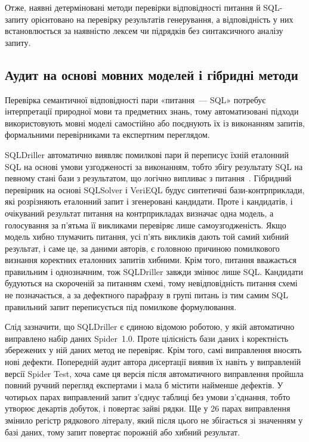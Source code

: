 \documentclass[a4paper,14pt,oneside]{extreport}
\begin{document}
Отже, наявні детерміновані методи перевірки відповідності питання й SQL-запиту орієнтовано на перевірку результатів генерування, а відповідність у них встановлюється за наявністю лексем чи підрядків без синтаксичного аналізу запиту.

\subsection{Аудит на основі мовних моделей і гібридні методи}
\label{subsec:llm-audit}

Перевірка семантичної відповідності пари «питання~--- SQL» потребує інтерпретації природної мови та предметних знань, тому автоматизовані підходи використовують мовні моделі самостійно або поєднують їх із виконанням запитів, формальними перевірниками та експертним переглядом.

SQLDriller автоматично виявляє помилкові пари й переписує їхній еталонний SQL на основі умови узгодженості за виконанням, тобто збігу результату SQL на певному стані бази з результатом, що логічно випливає з питання~\cite{yang2025sqldriller}. Гібридний перевірник на основі SQLSolver і VeriEQL будує синтетичні бази-контрприклади, які розрізняють еталонний запит і згенеровані кандидати. Проте і кандидатів, і очікуваний результат питання на контрприкладах визначає одна модель, а голосування за п'ятьма її викликами перевіряє лише самоузгодженість. Якщо модель хибно тлумачить питання, усі п'ять викликів дають той самий хибний результат, і саме це, за даними авторів, є головною причиною помилкового визнання коректних еталонних запитів хибними. Крім того, питання вважається правильним і однозначним, тож SQLDriller завжди змінює лише SQL. Кандидати будуються на скороченій за питанням схемі, тому невідповідність питання схемі не позначається, а за дефектного парафразу в групі питань із тим самим SQL правильний запит переписується під помилкове формулювання.

Слід зазначити, що SQLDriller є єдиною відомою роботою, у якій автоматично виправлено набір даних Spider~1.0. Проте цілісність бази даних і коректність збережених у ній даних метод не перевіряє. Крім того, самі виправлення вносять нові дефекти. Попередній аудит автора дисертації виявив їх навіть у виправленій версії Spider Test, хоча саме ця версія після автоматичного виправлення пройшла повний ручний перегляд експертами і мала б містити найменше дефектів. У чотирьох парах виправлений запит з'єднує таблиці без умови з'єднання, тобто утворює декартів добуток, і повертає зайві рядки. Ще у 26 парах виправлення змінило регістр рядкового літералу, який після цього не збігається зі значенням у базі даних, тому запит повертає порожній або хибний результат.
\end{document}
